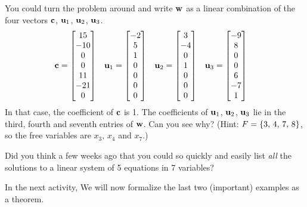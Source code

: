 \documentclass{ximera}
\begin{document}
\begin{example}
\begin{question}
    \begin{feedback}[correct]
      You could turn the problem around and write $\mathbf{w}$ as a
      linear combination of the four vectors $\mathbf{c}$, $\mathbf{u}_1$,
      $\mathbf{u}_2$, $\mathbf{u}_3$.
      \begin{align*}
        \mathbf{c}&=\begin{bmatrix}15\\ -10\\ 0\\ 0\\ 11\\ -21\\ 0\end{bmatrix}
                &
                  \mathbf{u}_1&=\begin{bmatrix}-2\\ 5\\ 1\\ 0\\ 0\\ 0\\ 0\end{bmatrix}
                &
                  \mathbf{u}_2&=\begin{bmatrix}3\\ -4\\ 0\\ 1\\ 0\\ 0\\ 0\end{bmatrix}
                &
                  \mathbf{u}_3&=\begin{bmatrix}-9\\ 8\\ 0\\ 0\\ 6\\ -7\\ 1\end{bmatrix}
      \end{align*}
      In that case, the coefficient of $\mathbf{c}$ is 1.  The
      coefficients of $\mathbf{u}_1$, $\mathbf{u}_2$, $\mathbf{u}_3$ lie in
      the third, fourth and seventh entries of $\mathbf{w}$.  Can you
      see why?  (Hint: $F=\left\{3,\,4,\,7,\,8\right\}$, so the free variables
      are $x_3,\,x_4$ and $x_7$.)
    \end{feedback}
  \end{question}
\end{example}

Did you think a few weeks ago that you could so quickly and easily
list \textit{all} the solutions to a linear system of 5 equations in 7
variables?

In the next activity, We will now formalize the last two (important)
examples as a theorem.
\end{document}
